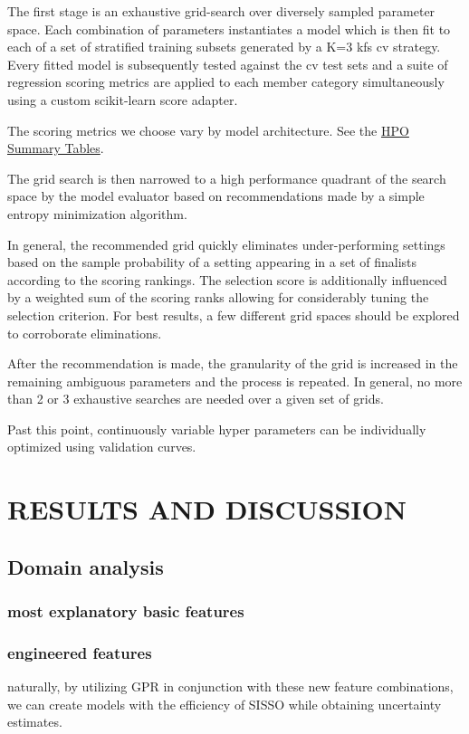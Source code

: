 \documentclass[aip, jmp, amsmath, amssymb]{revtex4-2}
\begin{document}
The first stage is an exhaustive grid-search over diversely sampled
parameter space. Each combination of parameters instantiates a model
which is then fit to each of a set of stratified training subsets
generated by a K=3 \gls{kfs} \gls{cv} strategy. Every
fitted model is subsequently tested against the \gls{cv} test
sets and a suite of regression scoring metrics are applied to each
member category simultaneously using a custom scikit-learn score
adapter.

The scoring metrics we choose vary by model architecture. See the \hyperref[sec:org98352a9]{HPO Summary Tables}.

The grid search is then narrowed to a high performance quadrant of the
search space by the model evaluator based on recommendations made by a
simple entropy minimization algorithm.

In general, the recommended grid quickly eliminates under-performing
settings based on the sample probability of a setting appearing in a
set of finalists according to the scoring rankings. The selection
score is additionally influenced by a weighted sum of the scoring
ranks allowing for considerably tuning the selection criterion.  For
best results, a few different grid spaces should be explored to
corroborate eliminations.

After the recommendation is made, the granularity of the grid is
increased in the remaining ambiguous parameters and the process is
repeated. In general, no more than 2 or 3 exhaustive searches are
needed over a given set of grids.

Past this point, continuously variable hyper parameters can be
individually optimized using validation curves.

\section*{RESULTS AND DISCUSSION}
\label{sec:orgb4cd6ae}
\subsection*{Domain analysis}
\label{sec:org070485f}
\subsubsection*{most explanatory basic features}
\label{sec:orgeb21408}
\subsubsection*{engineered features}
\label{sec:org7029928}
naturally, by utilizing GPR in conjunction with these new feature
combinations, we can create models with the efficiency of SISSO while
obtaining uncertainty estimates.
\end{document}
